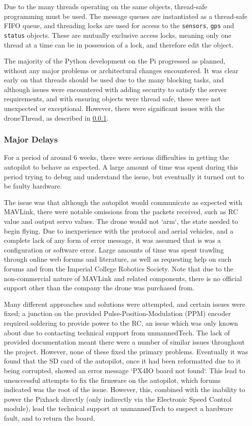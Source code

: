 \documentclass{article}
\begin{document}
Due to the many threads operating on the same objects, thread-safe programming must be used. The message queues are instantiated as a thread-safe FIFO queue, and threading locks are used for access to the \texttt{sensors}, \texttt{gps} and \texttt{status} objects. These are mutually exclusive access locks, meaning only one thread at a time can be in possession of a lock, and therefore edit the object.

The majority of the Python development on the Pi progressed as planned, without any major problems or architectural changes encountered. It was clear early on that threads should be used due to the many blocking tasks, and although issues were encountered with adding security to satisfy the server requirements, and with ensuring objects were thread safe, these were not unexpected or exceptional. However, there were significant issues with the droneThread, as described in \ref{MajorDelays}.

\subsubsection{Major Delays} \label{MajorDelays}
For a period of around 6 weeks, there were serious difficulties in getting the autopilot to behave as expected. A large amount of time was spent during this period trying to debug and understand the issue, but eventually it turned out to be faulty hardware. 

The issue was that although the autopilot would communicate as expected with MAVLink, there were notable omissions from the packets received, such as RC value and output servo values. The drone would not `arm`, the state needed to begin flying. Due to inexperience with the protocol and aerial vehicles, and a complete lack of any form of error message, it was assumed that is was a configuration or software error. Large amounts of time was spent trawling through online web forums and literature, as well as requesting help on such forums and from the Imperial College Robotics Society. Note that due to the non-commercial nature of MAVLink and related components, there is no official support other than the company the drone was purchased from. 

Many different approaches and solutions were attempted, and certain issues were fixed; a junction on the provided Pulse-Position-Modulation (PPM) encoder required soldering to provide power to the RC, an issue which was only known about due to contacting technical support from unmannedTech\cite{ppmSolder}. The lack of provided documentation meant there were a number of similar issues throughout the project. However, none of these fixed the primary problems. Eventually it was found that the SD card of the autopilot, once it had been reformatted due to it being corrupted, showed an error message `PX4IO board not found`. This lead to unsuccessful attempts to fix the firmware on the autopilot, which forums indicated was the root of the issue. However, this, combined with the inability to power the Pixhack directly (only indirectly via the Electronic Speed Control module), lead the technical support at unmannedTech to suspect a hardware fault, and to return the board\cite{px4ioNotFound}. 
\end{document}
